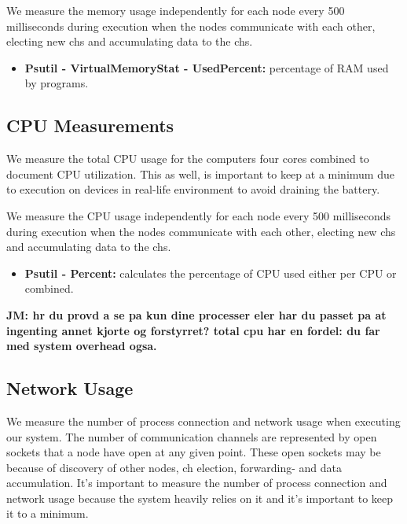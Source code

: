 \documentclass[USenglish]{uit-thesis}
\begin{document}

We measure the memory usage independently for each node every 500 milliseconds during execution when the nodes communicate with each other, electing new \glspl{ch} and accumulating data to the \glspl{ch}.

\begin{itemize}
\item \textbf{Psutil - VirtualMemoryStat - UsedPercent:} percentage of RAM used by programs.
\end{itemize}


\subsection{CPU Measurements} \label{eva:cpu_measure}
We measure the total CPU usage for the computers four cores combined to document CPU utilization. This as well, is important to keep at a minimum due to execution on devices in real-life environment to avoid draining the battery.

We measure the CPU usage independently for each node every 500 milliseconds during execution when the nodes communicate with each other, electing new \glspl{ch} and accumulating data to the \glspl{ch}.

\begin{itemize}
\item \textbf{Psutil - Percent:} calculates the percentage of CPU used either per CPU or combined.
\end{itemize}

\textbf{JM: hr du provd a se pa kun dine processer eler har du passet pa at ingenting annet kjorte og forstyrret? total cpu har en fordel: du far med system overhead ogsa.}


\subsection{Network Usage} \label{eva:net_measure}
We measure the number of process connection and network usage when executing our system. The number of communication channels are represented by open sockets that a node have open at any given point. These open sockets may be because of discovery of other nodes, \gls{ch} election, forwarding- and data accumulation. It's important to measure the number of process connection and network usage because the system heavily relies on it and it's important to keep it to a minimum.
\end{document}
